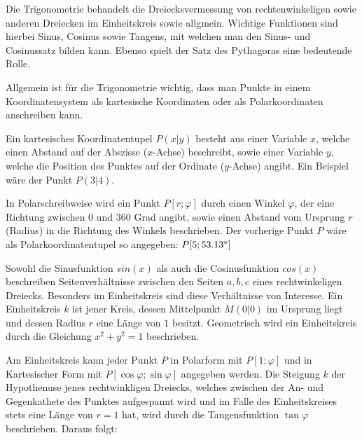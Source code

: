 



\thispagestyle{plain}



Die Trigonometrie behandelt die Dreiecksvermessung von rechtenwinkeligen sowie anderen Dreiecken im Einheitskreis sowie allgmein. Wichtige Funktionen sind hierbei Sinus, Cosinus sowie Tangens, mit welchen man den Sinus- und Cosinussatz bilden kann. Ebenso spielt der Satz des Pythagoras eine bedeutende Rolle.


Allgemein ist f\"{u}r die Trigonometrie wichtig, dass man Punkte in einem Koordinatensystem als kartesische Koordinaten oder als Polarkoordinaten anschreiben kann. 

Ein kartesisches Koordinatentupel $P (x | y)$ besteht aus einer Variable $x$, welche einen Abstand auf der Abszisse ($x$-Achse) beschreibt, sowie einer Variable $y$, welche die Position des Punktes auf der Ordinate ($y$-Achse) angibt. Ein Beispiel w\"{a}re der Punkt $P(3 | 4)$.

In Polarschreibweise wird ein Punkt $P [r; \varphi]$ durch einen Winkel $\varphi$, der eine Richtung zwischen $0$ und $360$ Grad angibt, sowie einen Abstand vom Ursprung $r$ (Radius) in die Richtung des Winkels beschrieben. Der vorherige Punkt $P$ w\"{a}re als Polarkoordinatentupel so angegeben: $P [5; 53.13\degree]$


Sowohl die Sinusfunktion $sin(x)$ als auch die Cosinusfunktion $cos(x)$ beschreiben Seitenverh\"{a}ltnisse zwischen den Seiten $a, b, c$ eines rechtwinkeligen Dreiecks. Besonders im Einheitskreis sind diese Verh\"{a}ltnisse von Interesse. Ein Einheitskreis $k$ ist jener Kreis, dessen Mittelpunkt $M (0 | 0)$ im Ursprung liegt und dessen Radius $r$ eine L\"{a}nge von $1$ besitzt. Geometrisch wird ein Einheitskreis durch die Gleichung $x^2 + y^2 = 1$ beschrieben.

Am Einheitskreis kann jeder Punkt $P$ in Polarform mit $P [1;\varphi]$ und in Kartesischer Form mit $P [\cos \varphi; \sin \varphi]$ angegeben werden. Die Steigung $k$ der Hypothenuse jenes rechtwinkligen Dreiecks, welches zwischen der An- und Gegenkathete des Punktes aufgespannt wird und im Falle des Einheitskreises stets eine L\"{a}nge von $r = 1$ hat, wird durch die Tangensfunktion $\tan \varphi$ beschrieben. Daraus folgt:

